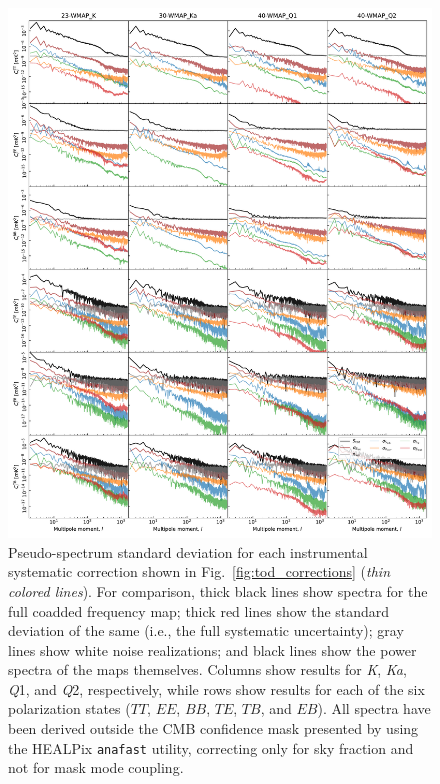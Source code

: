 \documentclass[twocolumn]{../../common/aa}
\newcommand{\K}[0]{\textit K}
\newcommand{\Ka}[0]{\textit{Ka}}
\newcommand{\Q}[0]{\textit Q}
\begin{document}
\begin{figure}
  \center	
   \includegraphics[width=\linewidth]{figures/components_power_spectrum_std_masked_WMAP_new_rms.pdf}
  \caption{Pseudo-spectrum standard deviation for each instrumental
    systematic correction shown in
    Fig.~\ref{fig:tod_corrections} (\emph{thin
      colored lines}). For comparison, thick black lines show spectra
    for the full coadded frequency map; thick red lines show the
    standard deviation of the same (i.e., the full systematic
    uncertainty); gray lines show white noise realizations; and black lines
    show the power spectra of the maps themselves. Columns show results for \K,
    \Ka, \Q1, and \Q2, respectively, while rows show results for each of
    the six polarization states ($TT$, $EE$, $BB$, $TE$, $TB$, and
    $EB$). All spectra have been derived outside the CMB confidence
    mask presented by \citet{bp13} using the HEALPix \texttt{anafast}
    utility, correcting only for sky fraction and not for mask mode
    coupling. }
  \label{fig:corrmap_stddev}
\end{figure}
\end{document}
